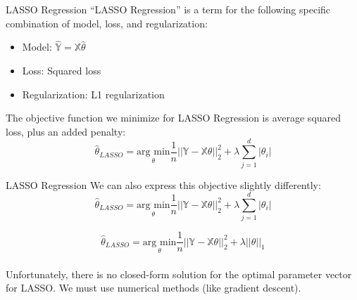 \documentclass[aspectratio=169]{../latex_main/tntbeamer}  %
\begin{document}
	
	\begin{frame}{LASSO  Regression}
	    “LASSO Regression” is a term for the following specific combination of model, loss, and regularization:
	    \begin{itemize}
	        \item Model: $\mathbb{\hat{Y}} = \mathbb{X}\hat{\theta}$
	        \item Loss: Squared loss
	        \item Regularization: L1 regularization
	    \end{itemize}
	    \bigskip
	    The objective function we minimize for LASSO  Regression is average squared loss, plus an added penalty:
	    \begin{equation*}
	        \hat{\theta}_{LASSO} = \underset{\theta}{\text{arg min}}\frac{1}{n}||\mathbb{Y} - \mathbb{X}\theta||_2^2 + \lambda \sum\limits_{j=1}^d|\theta_i|
	    \end{equation*}
	\end{frame}
	
	
	
	\begin{frame}{LASSO  Regression}
	    We can also express this objective slightly differently:
	    \begin{equation*}
	        \hat{\theta}_{LASSO} = \underset{\theta}{\text{arg min}}\frac{1}{n}||\mathbb{Y} - \mathbb{X}\theta||_2^2 + \lambda \sum\limits_{j=1}^d|\theta_i|
	    \end{equation*}
	    
	    \begin{equation*}
	        \hat{\theta}_{LASSO} = \underset{\theta}{\text{arg min}}\frac{1}{n}||\mathbb{Y} - \mathbb{X}\theta||_2^2 + \lambda ||\theta ||_1
	    \end{equation*}
	    \bigskip
	   \\Unfortunately, there is no closed-form solution for the optimal parameter vector for LASSO. We must use numerical methods (like gradient descent).

	\end{frame}
	
\end{document}
